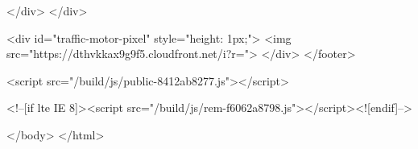             
            
        </div>
    </div>
    
    <div id="traffic-motor-pixel" style="height: 1px;">
        <img src="https://dthvkkax9g9f5.cloudfront.net/i?r=">
    </div>
</footer>

    
    <script src="/build/js/public-8412ab8277.js"></script>
    

    
    <!--[if lte IE 8]><script src="/build/js/rem-f6062a8798.js"></script><![endif]-->



</body>
</html>
